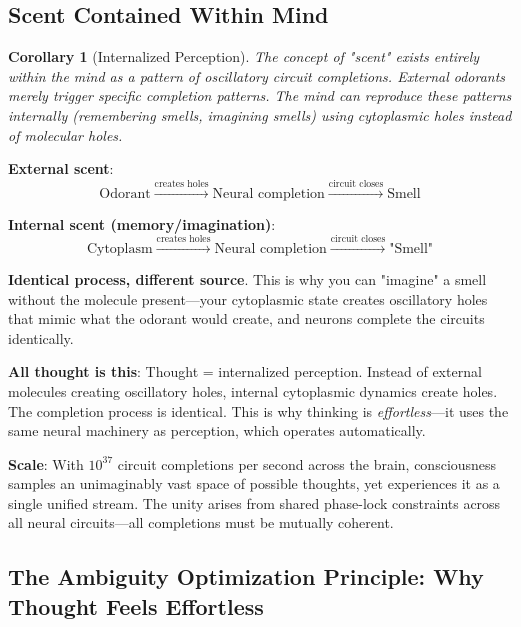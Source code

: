 \documentclass[11pt,a4paper]{article}
\newtheorem{corollary}[theorem]{Corollary}
\begin{document}
\subsection{Scent Contained Within Mind}

\begin{corollary}[Internalized Perception]
The concept of "scent" exists entirely within the mind as a pattern of oscillatory circuit completions. External odorants merely trigger specific completion patterns. The mind can reproduce these patterns internally (remembering smells, imagining smells) using cytoplasmic holes instead of molecular holes.
\end{corollary}

\textbf{External scent}: 
\begin{equation}
\text{Odorant} \xrightarrow{\text{creates holes}} \text{Neural completion} \xrightarrow{\text{circuit closes}} \text{Smell}
\end{equation}

\textbf{Internal scent (memory/imagination)}:
\begin{equation}
\text{Cytoplasm} \xrightarrow{\text{creates holes}} \text{Neural completion} \xrightarrow{\text{circuit closes}} \text{"Smell"}
\end{equation}

\textbf{Identical process, different source}. This is why you can "imagine" a smell without the molecule present—your cytoplasmic state creates oscillatory holes that mimic what the odorant would create, and neurons complete the circuits identically.

\textbf{All thought is this}: Thought = internalized perception. Instead of external molecules creating oscillatory holes, internal cytoplasmic dynamics create holes. The completion process is identical. This is why thinking is \textit{effortless}—it uses the same neural machinery as perception, which operates automatically.

\textbf{Scale}: With $10^{37}$ circuit completions per second across the brain, consciousness samples an unimaginably vast space of possible thoughts, yet experiences it as a single unified stream. The unity arises from shared phase-lock constraints across all neural circuits—all completions must be mutually coherent.

\subsection{The Ambiguity Optimization Principle: Why Thought Feels Effortless}
\end{document}
